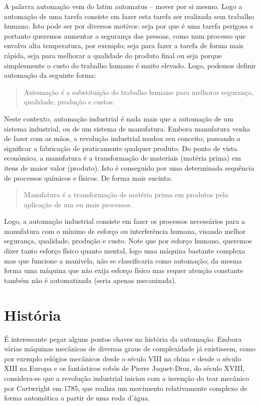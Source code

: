 A palavra automação vem do latim automatus -- mover por si mesmo. Logo a automação de uma tarefa consiste em fazer esta tarefa ser realizada sem trabalho humano. Isto pode ser por diversos motivos: seja por que é uma tarefa perigosa e portanto queremos aumentar a segurança das pessoas, como num processo que envolva alta temperatura, por exemplo; seja para fazer a tarefa de forma mais rápida, seja para melhorar a qualidade do produto final ou seja porque simplesmente o custo do trabalho humano é muito elevado. Logo, podemos definir automação da seguinte forma:
\begin{quote}
  Automação é a substituição do trabalho humano para melhorar segurança, qualidade, produção e custos.
\end{quote}

Neste contexto, automação industrial é nada mais que a automação de um sistema industrial, ou de um sistema de manufatura. Embora manufatura venha de fazer com as mãos, a revolução industrial mudou seu conceito, passando a significar a fabricação de praticamente qualquer produto. Do ponto de vista econômico, a manufatura é a transformação de materiais (matéria prima) em itens de maior valor (produto). Isto é conseguido por uma determinada sequência de processos químicos e físicos. De forma mais sucinta:
\begin{quote}
	Manufatura é a transformação de matéria prima em produtos pela aplicação de um ou mais processos.
\end{quote}

Logo, a automação industrial consiste em fazer os processos necessários para a manufatura com o mínimo de esforço ou interferência humana, visando melhor segurança, qualidade, produção e custo. Note que por esforço humano, queremos dizer tanto esforço físico quanto mental, logo uma máquina bastante complexa mas que funcione a manivela, não se classificaria como automação; da mesma forma uma máquina que não exija esforço físico mas requer atenção constante também não é automatizada (seria apenas mecanizada).

\section{História}
É interessante pegar alguns pontos chaves na história da automação. Embora várias máquinas mecânicas de diversas graus de complexidade já existissem, como por exemplo relógios mecânicos desde o século VIII na china e desde o século XIII na Europa e os fantásticos robôs de Pierre Jaquet-Droz, do século XVIII, considera-se que a revolução industrial iniciou com a invenção do tear mecânico por Cartwright em 1785, que realiza um movimento relativamente complexo de forma automática a partir de uma roda d'água.

